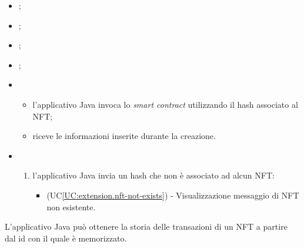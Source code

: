 \begin{itemize}
  \item {};
  \item {};
  \item {};
  \item {};
  
  \item \UCMain
  \begin{itemize}
    \item l'applicativo Java invoca lo \textit{smart contract} utilizzando il hash associato al NFT;
    \item riceve le informazioni inserite durante la creazione. 
  \end{itemize}
  
  \item \UCExt
  \begin{enumerate}[label=\lett]
    \item l'applicativo Java invia un hash che non è associato ad alcun NFT:
    \begin{itemize}
      \item (UC\ref{UC:extension.nft-not-exists}) - Visualizzazione messaggio di NFT non esistente.
    \end{itemize}
  \end{enumerate}
\end{itemize}

L'applicativo Java può ottenere la storia delle transazioni di un NFT a partire dal id con il quale è memorizzato.

